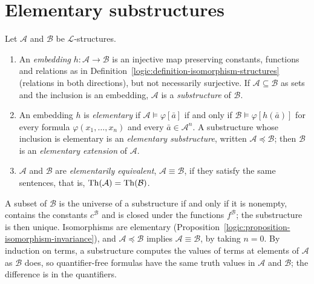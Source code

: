 \section{Elementary substructures}\label{model-theory:section-elementary}

\begin{definition}\label{model-theory:definition-elementary}
Let $\mathcal{A}$ and $\mathcal{B}$ be $\mathcal{L}$-structures.
\begin{enumerate}
\item An \emph{embedding} $h \colon \mathcal{A} \to \mathcal{B}$ is an injective map preserving constants, functions and relations as in
Definition~\ref{logic:definition-isomorphism-structures} (relations in both directions), but not necessarily surjective. If $\mathcal{A} \subseteq \mathcal{B}$ as
sets and the inclusion is an embedding, $\mathcal{A}$ is a \emph{substructure} of $\mathcal{B}$.
\item An embedding $h$ is \emph{elementary} if $\mathcal{A} \models \varphi[\bar{a}]$ if and only if $\mathcal{B} \models \varphi[h(\bar{a})]$ for every formula
$\varphi(x_1, \ldots, x_n)$ and every $\bar{a} \in \mathcal{A}^n$. A substructure whose inclusion is elementary is an \emph{elementary substructure}, written
$\mathcal{A} \preceq \mathcal{B}$; then $\mathcal{B}$ is an \emph{elementary extension} of $\mathcal{A}$.
\item $\mathcal{A}$ and $\mathcal{B}$ are \emph{elementarily equivalent}, $\mathcal{A} \equiv \mathcal{B}$, if they satisfy the same sentences, that is,
$\operatorname{Th}(\mathcal{A}) = \operatorname{Th}(\mathcal{B})$.
\end{enumerate}
\end{definition}

A subset of $\mathcal{B}$ is the universe of a substructure if and only if it is nonempty, contains the constants $c^{\mathcal{B}}$ and is closed under the
functions $f^{\mathcal{B}}$; the substructure is then unique. Isomorphisms are elementary (Proposition~\ref{logic:proposition-isomorphism-invariance}), and
$\mathcal{A} \preceq \mathcal{B}$ implies $\mathcal{A} \equiv \mathcal{B}$, by taking $n = 0$. By induction on terms, a substructure computes the values of
terms at elements of $\mathcal{A}$ as $\mathcal{B}$ does, so quantifier-free formulas have the same truth values in $\mathcal{A}$ and $\mathcal{B}$; the
difference is in the quantifiers.


